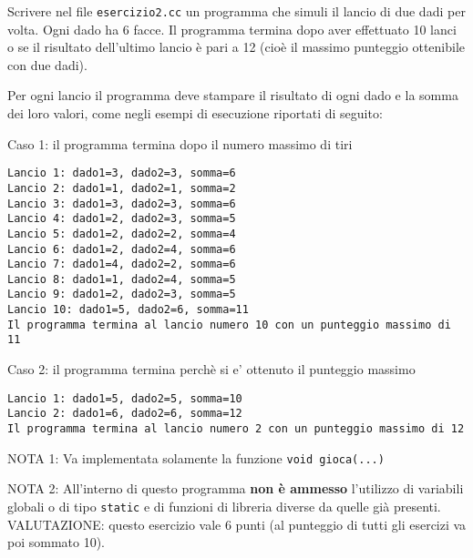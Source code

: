 %

Scrivere nel file {\tt esercizio2.cc} un programma che simuli il lancio di due dadi per volta. Ogni dado ha 6 facce. Il programma termina dopo aver effettuato 10 lanci o se il risultato dell'ultimo lancio \`e pari a 12 (cio\`e il massimo punteggio ottenibile con due dadi).

Per ogni lancio il programma deve stampare il risultato di ogni dado e la somma dei loro valori, come negli esempi di esecuzione riportati di seguito:

Caso 1: il programma termina dopo il numero massimo di tiri
\begin{verbatim}
Lancio 1: dado1=3, dado2=3, somma=6
Lancio 2: dado1=1, dado2=1, somma=2
Lancio 3: dado1=3, dado2=3, somma=6
Lancio 4: dado1=2, dado2=3, somma=5
Lancio 5: dado1=2, dado2=2, somma=4
Lancio 6: dado1=2, dado2=4, somma=6
Lancio 7: dado1=4, dado2=2, somma=6
Lancio 8: dado1=1, dado2=4, somma=5
Lancio 9: dado1=2, dado2=3, somma=5
Lancio 10: dado1=5, dado2=6, somma=11
Il programma termina al lancio numero 10 con un punteggio massimo di 11
\end{verbatim}

Caso 2: il programma termina perch\`e si e' ottenuto il punteggio massimo
\begin{verbatim}
Lancio 1: dado1=5, dado2=5, somma=10
Lancio 2: dado1=6, dado2=6, somma=12
Il programma termina al lancio numero 2 con un punteggio massimo di 12
\end{verbatim}

\vspace{.5cm}

NOTA 1: Va implementata solamente la funzione \verb|void gioca(...)|

NOTA 2: All'interno di questo programma {\bf non \`e ammesso} 
l'utilizzo di variabili globali o di tipo {\tt static} e di 
funzioni di libreria diverse da quelle gi\`a presenti. \\

VALUTAZIONE:
questo esercizio vale 6 punti (al punteggio di tutti gli esercizi va poi sommato 10).

%


